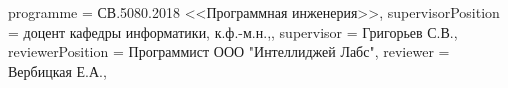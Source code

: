 {    %
    programme          = {СВ.5080.2018 <<Программная инженерия>>},
    supervisorPosition = {доцент кафедры информатики, к.ф.-м.н.,}, %
    supervisor         = {Григорьев С.В.},  
    reviewerPosition   = {Программист ООО "Интеллиджей Лабс"},
    reviewer           = {Вербицкая Е.А.},
}

